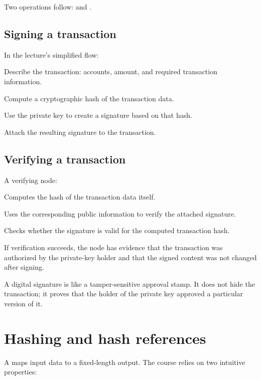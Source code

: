 Two operations follow:  and .

\subsection{Signing a transaction}

In the lecture's simplified flow:

\begin{utpsteps}
  \item Describe the transaction: accounts, amount, and required transaction information.
  \item Compute a cryptographic hash of the transaction data.
  \item Use the private key to create a signature based on that hash.
  \item Attach the resulting signature to the transaction.
\end{utpsteps}

\subsection{Verifying a transaction}

A verifying node:

\begin{utpsteps}
  \item Computes the hash of the transaction data itself.
  \item Uses the corresponding public information to verify the attached signature.
  \item Checks whether the signature is valid for the computed transaction hash.
\end{utpsteps}

If verification succeeds, the node has evidence that the transaction was authorized by the private-key holder and that the signed content was not changed after signing.

\begin{intuition}
A digital signature is like a tamper-sensitive approval stamp. It does not hide the transaction; it proves that the holder of the private key approved a particular version of it.
\end{intuition}

\section{Hashing and hash references}

A  maps input data to a fixed-length output. The course relies on two intuitive properties:

